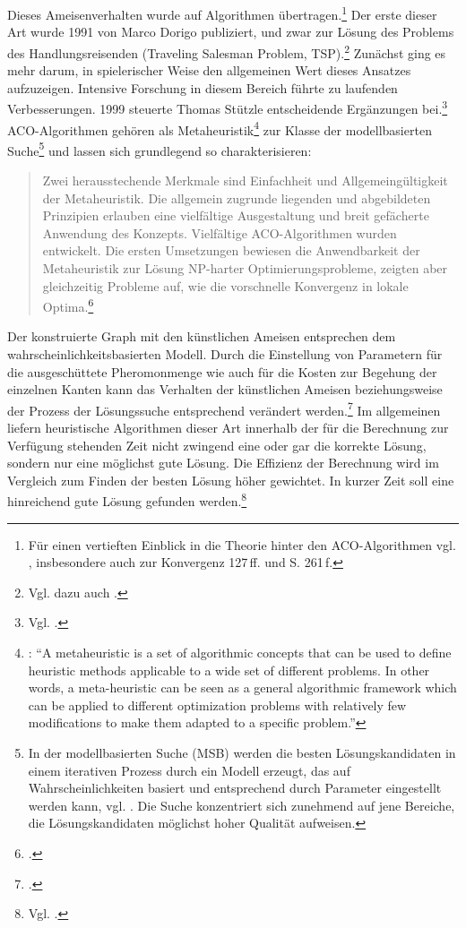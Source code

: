 Dieses Ameisenverhalten wurde auf Algorithmen übertragen.\footnote{Für einen
vertieften Einblick in die Theorie hinter den ACO-Algorithmen vgl. \citet*[S.
121\,ff.]{ds-ant}, insbesondere auch zur Konvergenz 127\,ff. und S. 261\,f.} Der
erste dieser Art wurde 1991 von Marco Dorigo publiziert, und zwar zur Lösung des
Problems des Handlungsreisenden (Traveling Salesman Problem, TSP).\footnote{Vgl.
dazu auch \citet*[S. 65\,ff.]{ds-ant}.} Zunächst ging es mehr darum, in
spielerischer Weise den allgemeinen Wert dieses Ansatzes aufzuzeigen. Intensive
Forschung in diesem Bereich führte zu laufenden Verbesserungen. 1999 steuerte
Thomas Stützle entscheidende Ergänzungen bei.\footnote{Vgl. \citet*{ds-ant,
wiki-antalg}.} ACO-Algorithmen gehören als Metaheuristik\footnote{\citet*[S.
62]{ds-ant}: \enquote{A metaheuristic is a set of algorithmic concepts that can
be used to define heuristic methods applicable to a wide set of different
problems. In other words, a meta-heuristic can be seen as a general algorithmic
framework which can be applied to different optimization problems with
relatively few modifications to make them adapted to a specific problem.}} zur
Klasse der modellbasierten Suche\footnote{In der modellbasierten Suche (MSB)
werden die besten Lösungskandidaten in einem iterativen Prozess durch ein Modell
erzeugt, das auf Wahrscheinlichkeiten basiert und entsprechend durch Parameter
eingestellt werden kann, vgl. \citet*[S. 138\,ff.]{ds-ant}. Die Suche
konzentriert sich zunehmend auf jene Bereiche, die Lösungskandidaten möglichst
hoher Qualität aufweisen.} und lassen sich grundlegend so charakterisieren:
\blockquote{Zwei herausstechende Merkmale sind Einfachheit und
Allgemeingültigkeit der Metaheuristik. Die allgemein zugrunde liegenden und
abgebildeten Prinzipien erlauben eine vielfältige Ausgestaltung und breit
gefächerte Anwendung des Konzepts. Vielfältige ACO-Algorithmen wurden
entwickelt. Die ersten Umsetzungen bewiesen die Anwendbarkeit der Metaheuristik
zur Lösung NP-harter Optimierungsprobleme, zeigten aber gleichzeitig Probleme
auf, wie die vorschnelle Konvergenz in lokale Optima.\footnote{\citet*[S.
19]{sch-koa}.}}

\noindent Der konstruierte Graph mit den künstlichen Ameisen entsprechen dem
wahrscheinlichkeitsbasierten Modell. Durch die Einstellung von Parametern für
die ausgeschüttete Pheromonmenge wie auch für die Kosten zur Begehung der
einzelnen Kanten kann das Verhalten der künstlichen Ameisen beziehungsweise der
Prozess der Lösungssuche entsprechend verändert
werden.\footnote{\citet*[Vgl.][S. 151]{ds-ant}.} Im allgemeinen liefern
heuristische Algorithmen dieser Art innerhalb der für die Berechnung zur
Verfügung stehenden Zeit nicht zwingend eine oder gar die korrekte Lösung,
sondern nur eine möglichst gute Lösung. Die Effizienz der Berechnung wird im
Vergleich zum Finden der besten Lösung höher gewichtet. In kurzer Zeit soll eine
hinreichend gute Lösung gefunden werden.\footnote{Vgl. \citet*[S.
25\,ff.]{ds-ant}.}

